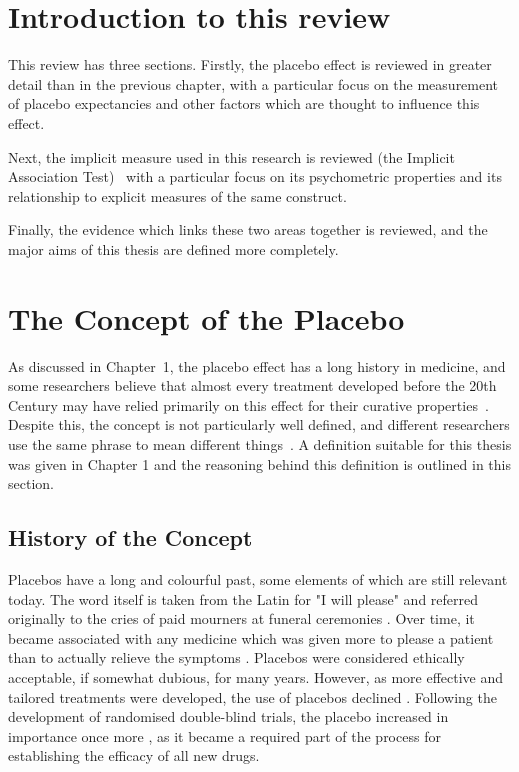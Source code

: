
\section{Introduction to this review}
\label{sec:intr-this-revi}

This review has three sections.  Firstly, the placebo effect is reviewed in greater detail than in the previous chapter, with a particular focus on the measurement of placebo expectancies and other factors which are thought to influence this effect.

Next, the implicit measure used in this research is reviewed (the Implicit Association Test)~\cite{Greenwald1998} with a particular focus on its psychometric properties and its relationship to explicit measures of the same construct. 

Finally, the evidence which links these two areas together is reviewed, and the major aims of this thesis are defined more completely. 


\section{The Concept of the Placebo}
\label{sec:concept-placebo}

As discussed in Chapter~1, the placebo effect has a long history in medicine, and some researchers believe that almost every treatment developed before the 20th Century may have relied primarily on this effect for their curative properties~\cite{Shapiro1997,Macedo2003}. Despite this, the concept is not particularly well defined, and different researchers use the same phrase to mean different things~\cite{Ernst1995b,hrobjartsson1996uncontrollable}. A definition suitable for this thesis was given in Chapter 1 and the reasoning behind this definition is outlined in this section. 

\subsection{History of the Concept} 
\label{sec:history-concept}

Placebos have a long and colourful past, some elements of which are still relevant today. The word itself is taken from the Latin for "I will please" and referred originally to the cries of paid mourners at funeral ceremonies \cite{Macedo2003}. Over time, it became associated with any medicine which was given more to please a patient than to actually relieve the symptoms \cite{Kaptchuk1998}. Placebos were considered ethically acceptable, if somewhat dubious, for many years. However, as more effective and tailored treatments were developed, the use of placebos declined \cite{Macedo2003}. Following the development of randomised double-blind trials, the  placebo increased in importance once more \cite{Kaptchuk1998}, as it became a required part of the process for establishing the efficacy of all new drugs.  

